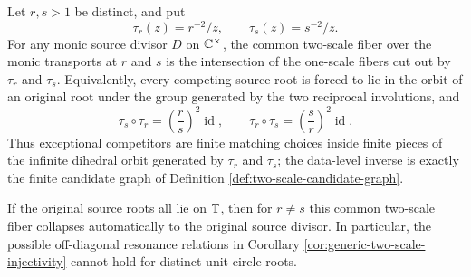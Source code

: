 \begin{corollary}\label{cor:dihedral-common-fiber}
Let \(r,s>1\) be distinct, and put
\[
\tau_r(z)=r^{-2}/z,\qquad \tau_s(z)=s^{-2}/z .
\]
For any monic source divisor \(D\) on \(\mathbb{C}^\times\), the common
two-scale fiber over the monic transports at \(r\) and \(s\) is the
intersection of the one-scale fibers cut out by \(\tau_r\) and
\(\tau_s\).  Equivalently, every competing source root is forced to
lie in the orbit of an original root under the group generated by the
two reciprocal involutions, and
\[
\tau_s\circ\tau_r=\left(\frac r s\right)^2\operatorname{id},
\qquad
\tau_r\circ\tau_s=\left(\frac s r\right)^2\operatorname{id}.
\]
Thus exceptional competitors are finite matching choices inside
finite pieces of the infinite dihedral orbit generated by
\(\tau_r\) and \(\tau_s\); the data-level inverse is exactly the finite
candidate graph of Definition \ref{def:two-scale-candidate-graph}.

If the original source roots all lie on \(\mathbb{T}\), then for \(r\ne s\)
this common two-scale fiber collapses automatically to the original
source divisor.  In particular, the possible off-diagonal resonance
relations in Corollary \ref{cor:generic-two-scale-injectivity} cannot
hold for distinct unit-circle roots.
\end{corollary}

